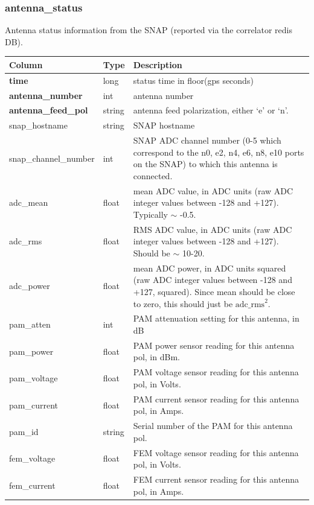 \documentclass{article}
\begin{document}
{\subsubsection{antenna\_status}
Antenna status information from the SNAP (reported via the correlator redis DB).
\begin{center}
\begin{tabular}{| p{4cm} | p{2cm} | p{10cm} |}
\hline
 {\bf Column} & {\bf Type}  & {\bf Description} \\ [0.5ex]  \hline\hline
\textbf{time} & long & status time in floor(gps seconds)\\ \hline
\textbf{antenna\_number} & int & antenna number \\ \hline
\textbf{antenna\_feed\_pol} & string & antenna feed polarization, either `e' or `n'. \\ \hline
snap\_hostname & string & SNAP hostname \\ \hline
snap\_channel\_number & int & SNAP ADC channel number (0-5 which correspond to the n0, e2, n4, e6, n8, e10 ports on the SNAP) to which this antenna is connected. \\ \hline
adc\_mean & float & mean ADC value, in ADC units (raw ADC integer values between -128 and +127). Typically $\sim$ -0.5. \\ \hline
adc\_rms & float & RMS ADC value, in ADC units (raw ADC integer values between -128 and +127).  Should be $\sim$ 10-20. \\ \hline
adc\_power & float & mean ADC power, in ADC units squared (raw ADC integer values between -128 and +127, squared). Since mean should be close to zero, this should just be $\text{adc\_rms}^2$. \\ \hline
pam\_atten & int & PAM attenuation setting for this antenna, in dB \\ \hline
pam\_power & float & PAM power sensor reading for this antenna pol, in dBm. \\ \hline
pam\_voltage & float & PAM voltage sensor reading for this antenna pol, in Volts. \\ \hline
pam\_current & float & PAM current sensor reading for this antenna pol, in Amps. \\ \hline
pam\_id & string & Serial number of the PAM for this antenna pol. \\ \hline
fem\_voltage & float & FEM voltage sensor reading for this antenna pol, in Volts. \\ \hline
fem\_current & float & FEM current sensor reading for this antenna pol, in Amps. \\ \hline

\end{tabular}
\end{center}}
\end{document}
